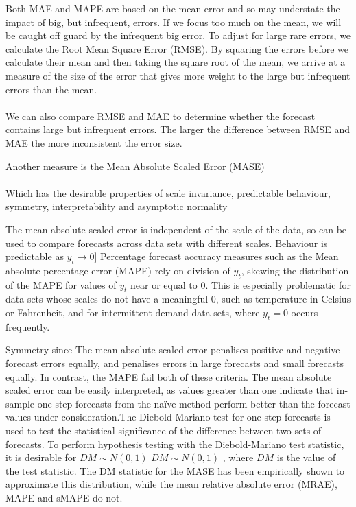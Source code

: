 Both MAE and MAPE are based on the mean error and so may understate the impact of big, but infrequent, errors. If we focus too much on the mean, we will be caught off guard by the infrequent big error. To adjust for large rare errors, we calculate the Root Mean Square Error (RMSE). By squaring the errors before we calculate their mean and then taking the square root of the mean, we arrive at a measure of the size of the error that gives more weight to the large but infrequent errors than the mean.\\

 \\

We can also compare RMSE and MAE to determine whether the forecast contains large but infrequent errors. The larger the difference between RMSE and MAE the more inconsistent the error size.
 
Another measure is the Mean Absolute Scaled Error (MASE) \\

 \\

Which has the desirable properties of scale invariance, predictable behaviour, symmetry, interpretability and asymptotic normality
 
The mean absolute scaled error is independent of the scale of the data, so can be used to compare forecasts across data sets with different scales. Behaviour is predictable as $y_{t}\rightarrow 0$] Percentage forecast accuracy measures such as the Mean absolute percentage error (MAPE) rely on division of $y_{t}$, skewing the distribution of the MAPE for values of $y_{t}$ near or equal to 0. This is especially problematic for data sets whose scales do not have a meaningful 0, such as temperature in Celsius or Fahrenheit, and for intermittent demand data sets, where $y_{t}=0$  occurs frequently.

Symmetry since The mean absolute scaled error penalises positive and negative forecast errors equally, and penalises errors in large forecasts and small forecasts equally. In contrast, the MAPE  fail both of these criteria. The mean absolute scaled error can be easily interpreted, as values greater than one indicate that in-sample one-step forecasts from the naïve method perform better than the forecast values under consideration.The Diebold-Mariano test for one-step forecasts is used to test the statistical significance of the difference between two sets of forecasts. To perform hypothesis testing with the Diebold-Mariano test statistic, it is desirable for $DM ∼ N ( 0 , 1 )$ $DM\sim N(0,1)$ , where $DM$ is the value of the test statistic. The DM statistic for the MASE has been empirically shown to approximate this distribution, while the mean relative absolute error (MRAE), MAPE and sMAPE do not.
 
